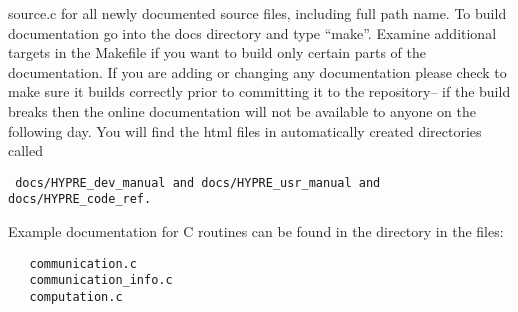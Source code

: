 source.c for all newly documented source files, including full path name. 
\newline\newline
To build documentation go into the docs directory and type ``make''.  
Examine additional targets in the Makefile if you want to build only
certain parts of the documentation.   If you are adding or changing any
documentation please check to make sure it builds correctly prior to 
committing it to the repository-- if the build breaks then the online 
documentation will not be available to anyone on the following day. You will
find the html files in automatically created directories called 
\begin{verbatim} docs/HYPRE_dev_manual and docs/HYPRE_usr_manual and docs/HYPRE_code_ref.\end{verbatim}


Example documentation for C routines can be found in the directory
 in the files:
\begin{verbatim}
   communication.c
   communication_info.c
   computation.c
\end{verbatim}

